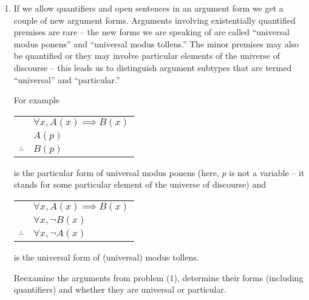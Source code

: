 \begin{enumerate}
{\vfill
}

\item If we allow quantifiers and open sentences in an argument form we
get a couple of new argument forms.  Arguments involving existentially quantified 
premises are rare -- the new forms we are speaking of are called ``universal modus 
ponens'' and ``universal modus tollens.''   The minor premises may also be quantified
or they may involve particular elements of the universe of discourse -- this leads
us to distinguish argument subtypes that are termed ``universal'' and ``particular.''

For example  \begin{tabular}{cl}
 & $\forall x, A(x) \implies B(x)$ \\
 & $A(p)$ \\ \hline
$\therefore$ & $B(p)$ \\
\end{tabular}  is the particular form of universal modus ponens (here, $p$
is not a variable -- it stands for some particular element of the universe of
discourse)
and \begin{tabular}{cl}
 & $\forall x, A(x) \implies B(x)$ \\
 & $\forall x, {\lnot}B(x)$ \\ \hline
$\therefore$ & $\forall x, {\lnot}A(x)$ \\
\end{tabular} is the universal form of (universal) modus tollens.

Reexamine the arguments from problem (1), determine their forms
(including quantifiers) and whether they are universal or particular.

\end{enumerate}
